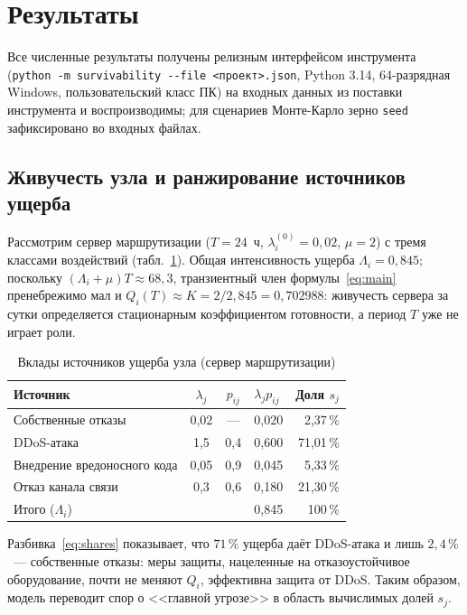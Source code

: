 \documentclass[12pt]{article}
\begin{document}
\section{Результаты}

Все численные результаты получены релизным интерфейсом инструмента
(\texttt{python -m survivability {-}-file <проект>.json}, Python 3.14,
64-разрядная Windows, пользовательский класс ПК) на входных данных из
поставки инструмента и воспроизводимы; для сценариев Монте-Карло зерно
\texttt{seed} зафиксировано во входных файлах.

\subsection{Живучесть узла и ранжирование источников ущерба}

Рассмотрим сервер маршрутизации ($T = 24$~ч, $\lambda_i^{(0)} = 0{,}02$,
$\mu = 2$) с тремя классами воздействий (табл.~\ref{tab:node}). Общая
интенсивность ущерба $\Lambda_i = 0{,}845$; поскольку $(\Lambda_i + \mu)T
\approx 68{,}3$, транзиентный член формулы~\eqref{eq:main} пренебрежимо мал
и $Q_i(T) \approx K = 2 / 2{,}845 = 0{,}702988$: живучесть сервера за
сутки определяется стационарным коэффициентом готовности, а период $T$
уже не играет роли.

\begin{table}[htb]
\centering
\caption{Вклады источников ущерба узла (сервер маршрутизации)}
\label{tab:node}
\begin{tabular}{@{}lcclr@{}}
\toprule
Источник & $\lambda_j$ & $p_{ij}$ & $\lambda_j p_{ij}$ & Доля $s_j$ \\
\midrule
Собственные отказы & 0{,}02 & --- & 0{,}020 & 2{,}37\,\% \\
DDoS-атака & 1{,}5 & 0{,}4 & 0{,}600 & 71{,}01\,\% \\
Внедрение вредоносного кода & 0{,}05 & 0{,}9 & 0{,}045 & 5{,}33\,\% \\
Отказ канала связи & 0{,}3 & 0{,}6 & 0{,}180 & 21{,}30\,\% \\
\midrule
Итого ($\Lambda_i$) & \multicolumn{2}{c}{} & 0{,}845 & 100\,\% \\
\bottomrule
\end{tabular}
\end{table}

Разбивка~\eqref{eq:shares} показывает, что $71\,\%$ ущерба даёт DDoS-атака
и лишь $2{,}4\,\%$~--- собственные отказы: меры защиты, нацеленные на
отказоустойчивое оборудование, почти не меняют $Q_i$, эффективна защита от
DDoS. Таким образом, модель переводит спор о <<главной угрозе>> в область
вычислимых долей $s_j$.
\end{document}
